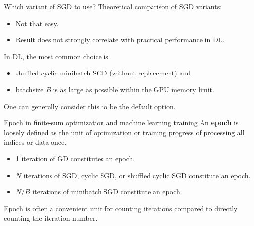 \begin{frame}[allowframebreaks]

\begin{myconceptblock}{2.20}{Which variant of SGD to use?}
    Theoretical comparison of SGD variants:

    \begin{itemize}
        \item Not that easy.
        \item Result does not strongly correlate with practical performance in DL.
    \end{itemize}

    In DL, the most common choice is

    \begin{itemize}
        \item shuffled cyclic minibatch SGD (without replacement) and
        \item batchsize $B$ is as large as possible within the GPU memory limit.
    \end{itemize}

    One can generally consider this to be the default option.
\end{myconceptblock}

\end{frame}

\begin{frame}[allowframebreaks]

\begin{mydefinitionblock}{2.21}{Epoch in finite-sum optimization and machine learning training}
    An \textbf{epoch} is loosely defined as the unit of optimization or training progress of processing all indices or data once.

    \begin{itemize}
        \item 1 iteration of GD constitutes an epoch.
        \item $N$ iterations of SGD, cyclic SGD, or shuffled cyclic SGD constitute an epoch.
        \item $N / B$ iterations of minibatch SGD constitute an epoch.
    \end{itemize}

    Epoch is often a convenient unit for counting iterations compared to directly counting the iteration number.
\end{mydefinitionblock}

\end{frame}

